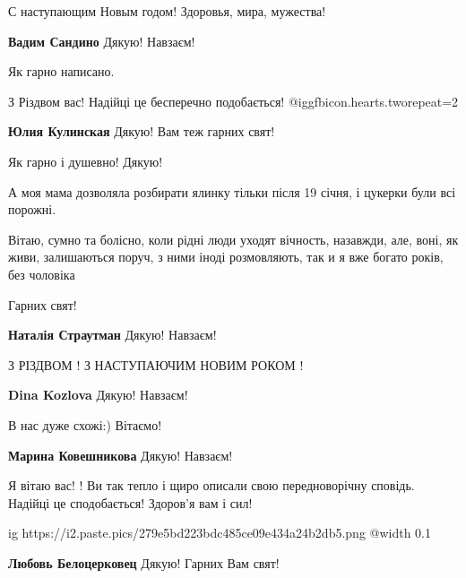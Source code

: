  
 
 
 
 
\zzSecCmt

\begin{itemize} %
С наступающим Новым годом! Здоровья, мира, мужества!

\textbf{Вадим Сандино} Дякую! Навзаєм!

Як гарно написано.

З Різдвом вас! Надійці це бесперечно подобається!  @igg{fbicon.hearts.two}{repeat=2} 

\textbf{Юлия Кулинская} Дякую! Вам теж гарних свят!

Як гарно і душевно! Дякую!

А моя мама дозволяла розбирати ялинку тільки після 19 січня, і цукерки були всі порожні.


Вітаю, сумно та болісно, коли рідні люди уходят вічность, назавжди, але, воні, як
живи, залишаються поруч, з ними іноді розмовляють, так и я вже богато років, без
чоловіка

Гарних свят!

\textbf{Наталія Страутман} Дякую! Навзаєм!

З РІЗДВОМ !
З НАСТУПАЮЧИМ НОВИМ РОКОМ !

\textbf{Dina Kozlova} Дякую! Навзаєм!

В нас дуже схожі:) Вітаємо!

\textbf{Марина Ковешникова} Дякую! Навзаєм!

Я вітаю вас! !
Ви так тепло і щиро описали свою передноворічну сповідь. Надійці це сподобається!
Здоров'я вам і сил!

\ifcmt
  ig https://i2.paste.pics/279e5bd223bdc485ce09e434a24b2db5.png
  @width 0.1
\fi

\textbf{Любовь Белоцерковец} Дякую! Гарних Вам свят!


\end{itemize}
